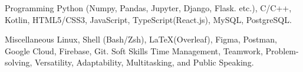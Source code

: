 

\begin{cvskills}

  \cvskill
    {Programming} %
    {Python (Numpy, Pandas, Jupyter, Django, Flask. etc.), C/C++, Kotlin, HTML5/CSS3, JavaScript, TypeScript(React.js), MySQL, PostgreSQL.} %

  \cvskill
    {Miscellaneous} %
    {Linux, Shell (Bash/Zsh), \LaTeX (Overleaf), Figma, Postman, Google Cloud, Firebase, Git.} %
  \cvskill
    {Soft Skills} %
    {Time Management, Teamwork, Problem-solving, Versatility,  Adaptability, Multitasking, and Public Speaking.} %

\end{cvskills}
